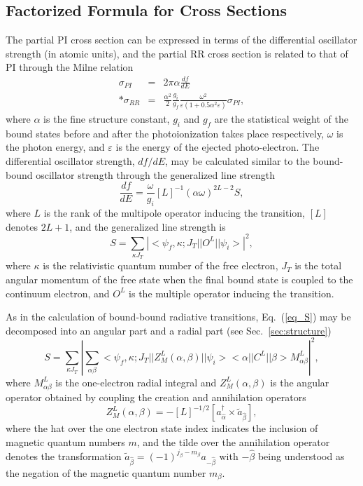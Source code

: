 \subsection{Factorized Formula for Cross Sections}
The partial PI cross section can be expressed in terms of the differential
oscillator strength (in atomic units), and the partial RR cross section is
related to that of PI through the Milne relation
\begin{eqnarray}
\sigma_{PI} &=&
2\pi\alpha\frac{ d f}{ d E} \nonumber\\*
\sigma_{RR} &=& \frac{\alpha^2}{2}\frac{g_i}{g_f}
\frac{\omega^2}{\varepsilon(1+0.5\alpha^2\varepsilon)}
\sigma_{PI},
\end{eqnarray}
where $\alpha$ is the fine structure constant, $g_i$ and $g_f$ are the
statistical weight of the bound states before and after the photoionization
takes place respectively, $\omega$ is the photon energy, and $\varepsilon$ is
the energy of the ejected photo-electron. 
The differential oscillator
strength, $df/dE$, may be calculated similar to the bound-bound oscillator
strength through the generalized line strength
\begin{equation}
\frac{df}{dE} = \frac{\omega}{g_i}[L]^{-1}(\alpha\omega)^{2L-2}S,
\end{equation}
where $L$ is the rank of the multipole operator inducing the transition,
$[L]$ denotes $2L+1$, and the generalized line strength is 
\begin{equation}
\label{eq_S}
S = \sum_{\kappa J_T}\left|<\psi_f,\kappa;J_T||O^L||\psi_i>\right|^2,
\end{equation}
where $\kappa$ is the relativistic quantum number of the free electron, $J_T$
is the total angular momentum of the free state when the final bound state is
coupled to the continuum electron, and $O^L$ is the multiple operator
inducing the transition.

As in the calculation of bound-bound radiative transitions,
Eq.~(\ref{eq_S}) may be decomposed into an angular part and a radial part
(see Sec.~\ref{sec:structure})
\begin{equation}
\label{eq_Sf}
S = \sum_{\kappa J_T}\left|\sum_{\alpha\beta}
<\psi_f,\kappa;J_T||Z^L_M(\alpha,\beta)||\psi_i><\alpha||C^L||\beta>
M^L_{\alpha\beta}\right|^2,
\end{equation}
where $M^L_{\alpha\beta}$ is the one-electron radial integral and
$Z^L_M(\alpha,\beta)$ is the angular operator obtained by coupling the
creation and annihilation operators
\begin{equation}
Z^L_M(\alpha,\beta) = -[L]^{-1/2}\left[a^{\dagger}_{\hat{\alpha}}\times
\tilde{a}_{\hat{\beta}}\right],
\end{equation}
where the hat over the one electron state index indicates the inclusion of
magnetic quantum numbers $m$, and the tilde over the annihilation operator
denotes the transformation $\tilde{a}_{\hat{\beta}} = (-1)^{j_\beta -
m_\beta}a_{-\hat{\beta}}$ with $-\hat{\beta}$ being understood as the negation
of the magnetic quantum number $m_\beta$. 

